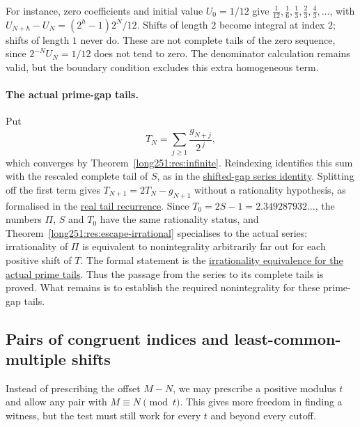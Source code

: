 For instance, zero coefficients and initial value $U_0=1/12$ give
$\tfrac1{12},\tfrac16,\tfrac13,\tfrac23,\tfrac43,\ldots$, with
$U_{N+h}-U_N=(2^h-1)2^N/12$.  Shifts of length $2$ become integral
at index $2$; shifts of length $1$ never do.  These are not complete
tails of the zero sequence, since $2^{-N}U_N=1/12$ does not tend to
zero.  The denominator calculation remains valid, but the boundary
condition excludes this extra homogeneous term.

\paragraph{The actual prime-gap tails.}
Put
\[
 T_N=\sum_{j\ge1}\frac{g_{N+j}}{2^{\,j}},
\]
which converges by Theorem~\ref{long251:res:infinite}.  Reindexing identifies
this sum with the rescaled complete tail of $S$, as in the
\href{https://github.com/wcook04/plectis-erdos/blob/3d6d938d696fed0fb71dd55115a18a73738ff223/lean/ErdosProblems/Erdos251/RealPrimeGapTail.lean\#L31}{shifted-gap
series identity}.  Splitting off the first term gives
$T_{N+1}=2T_N-g_{N+1}$ without a rationality hypothesis, as formalised in the
\href{https://github.com/wcook04/plectis-erdos/blob/3d6d938d696fed0fb71dd55115a18a73738ff223/lean/ErdosProblems/Erdos251/RealPrimeGapTail.lean\#L48}{real
tail recurrence}.  Since $T_0=2S-1=2.349287932\ldots$, the numbers $\Pi$, $S$
and $T_0$ have the same rationality status, and
Theorem~\ref{long251:res:escape-irrational} specialises to the actual series:
irrationality of $\Pi$ is equivalent to nonintegrality arbitrarily far out
for each positive shift of $T$.  The formal statement is the
\href{https://github.com/wcook04/plectis-erdos/blob/3d6d938d696fed0fb71dd55115a18a73738ff223/lean/ErdosProblems/Erdos251/RealPrimeGapTail.lean\#L73}{irrationality equivalence for the actual prime tails}.  Thus the passage from the series to its complete tails
is proved.  What remains is to establish the required nonintegrality for
these prime-gap tails.

\subsection{Pairs of congruent indices and least-common-multiple shifts}\label{long251:sec:freepair}

Instead of prescribing the offset $M-N$, we may prescribe a positive
modulus $t$ and allow any pair with $M\equiv N\pmod t$.  This gives
more freedom in finding a witness, but the test must still work for
every $t$ and beyond every cutoff.

